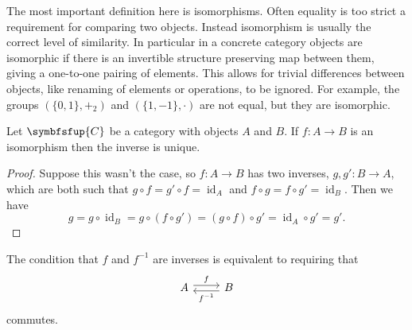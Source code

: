 \documentclass[fleqn]{NotesClass}
\newcommand{\cat}[1]{\symbfsfup{#1}}
\DeclareMathOperator{\id}{id}
\begin{document}
    The most important definition here is isomorphisms.
    Often equality is too strict a requirement for comparing two objects.
    Instead isomorphism is usually the correct level of similarity.
    In particular in a concrete category objects are isomorphic if there is an invertible structure preserving map between them, giving a one-to-one pairing of elements.
    This allows for trivial differences between objects, like renaming of elements or operations, to be ignored.
    For example, the groups \((\{0, 1\}, +_2)\) and \((\{1, -1\}, \cdot)\) are not equal, but they are isomorphic.
    
    \begin{lma}{}{}
        Let \(\cat{C}\) be a category with objects \(A\) and \(B\).
        If \(f \colon A \to B\) is an isomorphism then the inverse is unique.
        \begin{proof}
            Suppose this wasn't the case, so \(f \colon A \to B\) has two inverses, \(g, g' \colon B \to A\), which are both such that \(g \circ f = g' \circ f = \id_A\) and \(f \circ g = f \circ g' = \id_B\).
            Then we have
            \begin{equation}
                g = g \circ \id_B = g \circ (f \circ g') = (g \circ f) \circ g' = \id_A \circ g' = g'.
            \end{equation}
        \end{proof}
    \end{lma}
    
    The condition that \(f\) and \(f^{-1}\) are inverses is equivalent to requiring that
    \begin{equation}
        \begin{tikzcd}
            A \arrow[r, "f", shift left=1] & B \arrow[l, "f^{-1}", shift left=1]
        \end{tikzcd}
    \end{equation}
    commutes.
    
\end{document}
